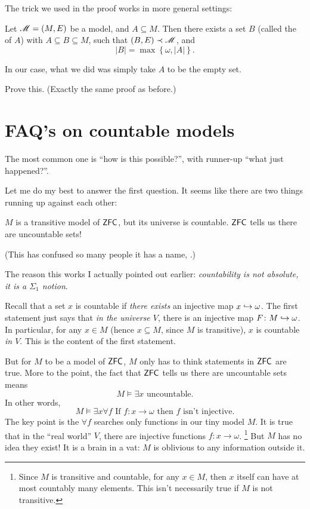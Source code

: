 The trick we used in the proof works in more general settings:
\begin{theorem}
	Let $\mathscr M = (M,E)$ be a model, and $A \subseteq M$.
	Then there exists a set $B$ (called the  of $A$)
	with $A \subseteq B \subseteq M$,
	such that $(B,E) \prec \mathscr M$, and
	\[ \left\lvert B \right\rvert =
		\max \left\{ \omega, \left\lvert A \right\rvert \right\}. \]
\end{theorem}
In our case, what we did was simply take $A$ to be the empty set.
\begin{ques}
	Prove this. (Exactly the same proof as before.)
\end{ques}


\section{FAQ's on countable models}
The most common one is ``how is this possible?'',
with runner-up ``what just happened?''.

Let me do my best to answer the first question.
It seems like there are two things running up against each other:
\begin{enumerate}[(1)]
	\ii $M$ is a transitive model of $\mathsf{ZFC}$, but its universe is countable.
	\ii $\mathsf{ZFC}$ tells us there are uncountable sets!
\end{enumerate}
(This has confused so many people it has a name, .)

The reason this works I actually pointed out earlier:
\emph{countability is not absolute, it is a $\Sigma_1$ notion}.

Recall that a set $x$ is countable if
\emph{there exists} an injective map $x \hookrightarrow \omega$.
The first statement just says that \emph{in the universe $V$},
there is an injective map $F \colon M \hookrightarrow \omega$.
In particular, for any $x \in M$ (hence $x \subseteq M$, since $M$ is transitive),
$x$ is countable \emph{in $V$}.
This is the content of the first statement.

But for $M$ to be a model of $\mathsf{ZFC}$, $M$ only has to think statements in $\mathsf{ZFC}$ are true.
More to the point, the fact that $\mathsf{ZFC}$ tells us there are uncountable sets means
\[ M \vDash \text{$\exists x$ uncountable}. \]
In other words,
\[ M \vDash \exists x \forall f
	\text{ If $f \colon x \to \omega$ then $f$ isn't injective}. \]
The key point is the $\forall f$ searches only functions in our tiny model $M$.
It is true that in the ``real world'' $V$, there are injective functions $f \colon x \to \omega$.%
\footnote{Since $M$ is transitive and countable, for any $x \in M$, then $x$ itself can have at most
countably many elements. This isn't necessarily true if $M$ is not transitive.}
But $M$ has no idea they exist!
It is a brain in a vat: $M$ is oblivious to any information outside it.

